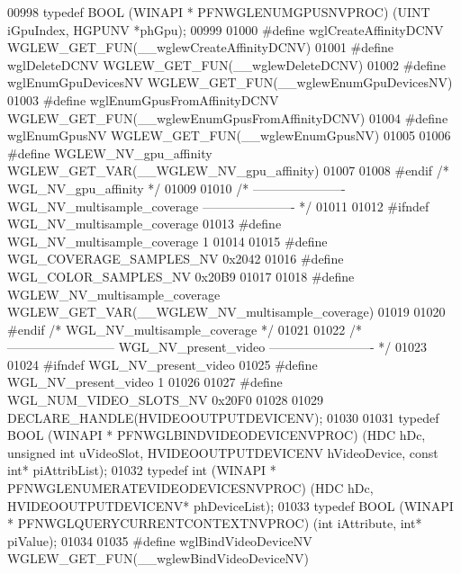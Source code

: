 \begin{DoxyCode}
00998 \textcolor{keyword}{typedef} BOOL (WINAPI * PFNWGLENUMGPUSNVPROC) (UINT iGpuIndex, HGPUNV *phGpu);
00999 
01000 \textcolor{preprocessor}{#define wglCreateAffinityDCNV WGLEW\_GET\_FUN(\_\_wglewCreateAffinityDCNV)}
01001 \textcolor{preprocessor}{#define wglDeleteDCNV WGLEW\_GET\_FUN(\_\_wglewDeleteDCNV)}
01002 \textcolor{preprocessor}{#define wglEnumGpuDevicesNV WGLEW\_GET\_FUN(\_\_wglewEnumGpuDevicesNV)}
01003 \textcolor{preprocessor}{#define wglEnumGpusFromAffinityDCNV WGLEW\_GET\_FUN(\_\_wglewEnumGpusFromAffinityDCNV)}
01004 \textcolor{preprocessor}{#define wglEnumGpusNV WGLEW\_GET\_FUN(\_\_wglewEnumGpusNV)}
01005 
01006 \textcolor{preprocessor}{#define WGLEW\_NV\_gpu\_affinity WGLEW\_GET\_VAR(\_\_WGLEW\_NV\_gpu\_affinity)}
01007 
01008 \textcolor{preprocessor}{#endif }\textcolor{comment}{/* WGL\_NV\_gpu\_affinity */}\textcolor{preprocessor}{}
01009 
01010 \textcolor{comment}{/* ---------------------- WGL\_NV\_multisample\_coverage ---------------------- */}
01011 
01012 \textcolor{preprocessor}{#ifndef WGL\_NV\_multisample\_coverage}
01013 \textcolor{preprocessor}{#define WGL\_NV\_multisample\_coverage 1}
01014 
01015 \textcolor{preprocessor}{#define WGL\_COVERAGE\_SAMPLES\_NV 0x2042}
01016 \textcolor{preprocessor}{#define WGL\_COLOR\_SAMPLES\_NV 0x20B9}
01017 
01018 \textcolor{preprocessor}{#define WGLEW\_NV\_multisample\_coverage WGLEW\_GET\_VAR(\_\_WGLEW\_NV\_multisample\_coverage)}
01019 
01020 \textcolor{preprocessor}{#endif }\textcolor{comment}{/* WGL\_NV\_multisample\_coverage */}\textcolor{preprocessor}{}
01021 
01022 \textcolor{comment}{/* -------------------------- WGL\_NV\_present\_video ------------------------- */}
01023 
01024 \textcolor{preprocessor}{#ifndef WGL\_NV\_present\_video}
01025 \textcolor{preprocessor}{#define WGL\_NV\_present\_video 1}
01026 
01027 \textcolor{preprocessor}{#define WGL\_NUM\_VIDEO\_SLOTS\_NV 0x20F0}
01028 
01029 DECLARE_HANDLE(HVIDEOOUTPUTDEVICENV);
01030 
01031 \textcolor{keyword}{typedef} BOOL (WINAPI * PFNWGLBINDVIDEODEVICENVPROC) (HDC hDc, \textcolor{keywordtype}{unsigned} \textcolor{keywordtype}{int} 
      uVideoSlot, HVIDEOOUTPUTDEVICENV hVideoDevice, \textcolor{keyword}{const} \textcolor{keywordtype}{int}* piAttribList);
01032 \textcolor{keyword}{typedef} int (WINAPI * PFNWGLENUMERATEVIDEODEVICESNVPROC) (HDC hDc, HVIDEOOUTPUTDEVICENV* 
      phDeviceList);
01033 \textcolor{keyword}{typedef} BOOL (WINAPI * PFNWGLQUERYCURRENTCONTEXTNVPROC) (\textcolor{keywordtype}{int} iAttribute, \textcolor{keywordtype}{int}* 
      piValue);
01034 
01035 \textcolor{preprocessor}{#define wglBindVideoDeviceNV WGLEW\_GET\_FUN(\_\_wglewBindVideoDeviceNV)}

\end{DoxyCode}
